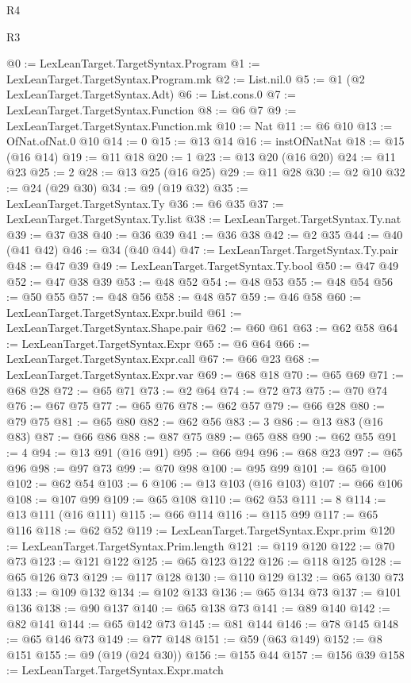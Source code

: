 \begin{lexlean}{R4}
\begin{lexlean}{R3}
\begin{coremodule}
{{{{{{{{{{{{{{{{@0 := LexLeanTarget.TargetSyntax.Program
@1 := LexLeanTarget.TargetSyntax.Program.mk
@2 := List.nil.{0}
@5 := @1 (@2 LexLeanTarget.TargetSyntax.Adt)
@6 := List.cons.{0}
@7 := LexLeanTarget.TargetSyntax.Function
@8 := @6 @7
@9 := LexLeanTarget.TargetSyntax.Function.mk
@10 := Nat
@11 := @6 @10
@13 := OfNat.ofNat.{0} @10
@14 := 0
@15 := @13 @14
@16 := instOfNatNat
@18 := @15 (@16 @14)
@19 := @11 @18
@20 := 1
@23 := @13 @20 (@16 @20)
@24 := @11 @23
@25 := 2
@28 := @13 @25 (@16 @25)
@29 := @11 @28
@30 := @2 @10
@32 := @24 (@29 @30)
@34 := @9 (@19 @32)
@35 := LexLeanTarget.TargetSyntax.Ty
@36 := @6 @35
@37 := LexLeanTarget.TargetSyntax.Ty.list
@38 := LexLeanTarget.TargetSyntax.Ty.nat
@39 := @37 @38
@40 := @36 @39
@41 := @36 @38
@42 := @2 @35
@44 := @40 (@41 @42)
@46 := @34 (@40 @44)
@47 := LexLeanTarget.TargetSyntax.Ty.pair
@48 := @47 @39
@49 := LexLeanTarget.TargetSyntax.Ty.bool
@50 := @47 @49
@52 := @47 @38 @39
@53 := @48 @52
@54 := @48 @53
@55 := @48 @54
@56 := @50 @55
@57 := @48 @56
@58 := @48 @57
@59 := @46 @58
@60 := LexLeanTarget.TargetSyntax.Expr.build
@61 := LexLeanTarget.TargetSyntax.Shape.pair
@62 := @60 @61
@63 := @62 @58
@64 := LexLeanTarget.TargetSyntax.Expr
@65 := @6 @64
@66 := LexLeanTarget.TargetSyntax.Expr.call
@67 := @66 @23
@68 := LexLeanTarget.TargetSyntax.Expr.var
@69 := @68 @18
@70 := @65 @69
@71 := @68 @28
@72 := @65 @71
@73 := @2 @64
@74 := @72 @73
@75 := @70 @74
@76 := @67 @75
@77 := @65 @76
@78 := @62 @57
@79 := @66 @28
@80 := @79 @75
@81 := @65 @80
@82 := @62 @56
@83 := 3
@86 := @13 @83 (@16 @83)
@87 := @66 @86
@88 := @87 @75
@89 := @65 @88
@90 := @62 @55
@91 := 4
@94 := @13 @91 (@16 @91)
@95 := @66 @94
@96 := @68 @23
@97 := @65 @96
@98 := @97 @73
@99 := @70 @98
@100 := @95 @99
@101 := @65 @100
@102 := @62 @54
@103 := 6
@106 := @13 @103 (@16 @103)
@107 := @66 @106
@108 := @107 @99
@109 := @65 @108
@110 := @62 @53
@111 := 8
@114 := @13 @111 (@16 @111)
@115 := @66 @114
@116 := @115 @99
@117 := @65 @116
@118 := @62 @52
@119 := LexLeanTarget.TargetSyntax.Expr.prim
@120 := LexLeanTarget.TargetSyntax.Prim.length
@121 := @119 @120
@122 := @70 @73
@123 := @121 @122
@125 := @65 @123 @122
@126 := @118 @125
@128 := @65 @126 @73
@129 := @117 @128
@130 := @110 @129
@132 := @65 @130 @73
@133 := @109 @132
@134 := @102 @133
@136 := @65 @134 @73
@137 := @101 @136
@138 := @90 @137
@140 := @65 @138 @73
@141 := @89 @140
@142 := @82 @141
@144 := @65 @142 @73
@145 := @81 @144
@146 := @78 @145
@148 := @65 @146 @73
@149 := @77 @148
@151 := @59 (@63 @149)
@152 := @8 @151
@155 := @9 (@19 (@24 @30))
@156 := @155 @44
@157 := @156 @39
@158 := LexLeanTarget.TargetSyntax.Expr.match
}}}}}}}}}}}}}}}}
\end{coremodule}
\end{lexlean}
\end{lexlean}
